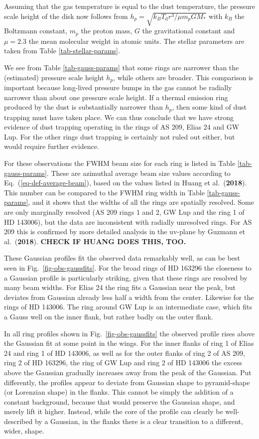 \documentclass{aa}
\def\paperdsharphuangrings{Huang et al.\ ({\bf 2018})}
\def\paperdsharpguzmann{Guzmann et al.\ ({\bf 2018})}
\begin{document}
Assuming that the gas temperature is equal to the dust temperature, the
pressure scale height of the disk now
follows from $h_p=\sqrt{k_BT_{\mathrm{d}}r^3/\mu m_pGM_{*}}$ with $k_B$ the
Boltzmann constant, $m_p$ the proton mass, $G$ the gravitational constant and
$\mu=2.3$ the mean molecular weight in atomic units. The stellar parameters are
taken from Table \ref{tab-stellar-params}.

We see from Table \ref{tab-gauss-params} that some rings are narrower than the
(estimated) pressure scale height $h_p$, while others are broader. This
comparison is important because long-lived pressure bumps in the gas cannot be
radially narrower than about one pressure scale height. If a thermal emission
ring produced by the dust is substantially narrower than $h_p$, then some kind
of dust trapping must have taken place. We can thus conclude that we have strong
evidence of dust trapping operating in the rings of AS 209, Elias 24 and GW Lup.
For the other rings dust trapping is certainly not ruled out either, but would
require further evidence. 

For these observations the FWHM beam size for each ring is listed in Table
\ref{tab-gauss-params}. These are azimuthal average beam size values according
to Eq.~(\ref{eq-def-average-beam}), based on the values listed in
\paperdsharphuangrings{}. This number can be compared to the FWHM ring width in
Table \ref{tab-gauss-params}, and it shows that the widths of all the rings are
spatially resolved. Some are only marginally resolved (AS 209 rings 1 and 2, GW
Lup and the ring 1 of HD 143006), but the data are inconsistent with radially
unresolved rings. For AS 209 this is confirmed by more detailed analysis in the
uv-plane by \paperdsharpguzmann{}. {\bf CHECK IF HUANG DOES THIS, TOO.}

These Gaussian profiles fit the observed data remarkably well, as can be best
seen in Fig.~\ref{fig-obs-gaussfits}.  For the broad rings of HD 163296 the
closeness to a Gaussian profile is particularly striking, given that these rings
are resolved by many beam widths.  For Elias 24 the ring fits a Gaussian near
the peak, but deviates from Gaussian already less half a width from the
center. Likewise for the rings of HD 143006. The ring around GW Lup is an
intermediate case, which fits a Gauss well on the inner flank, but rather badly
on the outer flank.

In all ring profiles shown in Fig.~\ref{fig-obs-gaussfits} the observed profile
rises above the Gaussian fit at some point in the wings. For the inner flanks of
ring 1 of Elias 24 and ring 1 of HD 143006, as well as for the outer flanks of
ring 2 of AS 209, ring 2 of HD 163296, the ring of GW Lup and ring 2 of HD
143006 the excess above the Gaussian gradually increases away from the peak of
the Gaussian. Put differently, the profiles appear to deviate from Gaussian
shape to pyramid-shape (or Lorenzian shape) in the flanks. This cannot be simply
the addition of a constant background, because that would preserve the Gaussian
shape, and merely lift it higher. Instead, while the core of the profile can clearly
be well-described by a Gaussian, in the flanks there is a clear transition
to a different, wider, shape.
\end{document}
